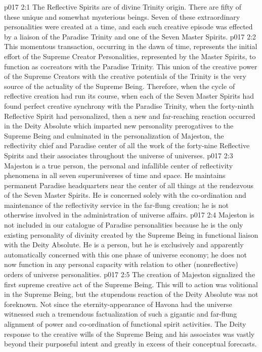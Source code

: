 \vs p017 2:1 The Reflective Spirits are of divine Trinity origin. There are fifty of these unique and somewhat mysterious beings. Seven of these extraordinary personalities were created at a time, and each such creative episode was effected by a liaison of the Paradise Trinity and one of the Seven Master Spirits.
\vs p017 2:2 This momentous transaction, occurring in the dawn of time, represents the initial effort of the Supreme Creator Personalities, represented by the Master Spirits, to function as cocreators with the Paradise Trinity. This union of the creative power of the Supreme Creators with the creative potentials of the Trinity is the very source of the actuality of the Supreme Being. Therefore, when the cycle of reflective creation had run its course, when each of the Seven Master Spirits had found perfect creative synchrony with the Paradise Trinity, when the forty\hyp{}ninth Reflective Spirit had personalized, then a new and far\hyp{}reaching reaction occurred in the Deity Absolute which imparted new personality prerogatives to the Supreme Being and culminated in the personalization of Majeston, the reflectivity chief and Paradise center of all the work of the forty\hyp{}nine Reflective Spirits and their associates throughout the universe of universes.
\vs p017 2:3 Majeston is a true person, the personal and infallible center of reflectivity phenomena in all seven superuniverses of time and space. He maintains permanent Paradise headquarters near the center of all things at the rendezvous of the Seven Master Spirits. He is concerned solely with the co\hyp{}ordination and maintenance of the reflectivity service in the far\hyp{}flung creation; he is not otherwise involved in the administration of universe affairs.
\vs p017 2:4 Majeston is not included in our catalogue of Paradise personalities because he is the only existing personality of divinity created by the Supreme Being in functional liaison with the Deity Absolute. He is a person, but he is exclusively and apparently automatically concerned with this one phase of universe economy; he does not now function in any personal capacity with relation to other (nonreflective) orders of universe personalities.
\vs p017 2:5 \pc The creation of Majeston signalized the first supreme creative act of the Supreme Being. This will to action was volitional in the Supreme Being, but the stupendous reaction of the Deity Absolute was not foreknown. Not since the eternity\hyp{}appearance of Havona had the universe witnessed such a tremendous factualization of such a gigantic and far\hyp{}flung alignment of power and co\hyp{}ordination of functional spirit activities. The Deity response to the creative wills of the Supreme Being and his associates was vastly beyond their purposeful intent and greatly in excess of their conceptual forecasts.
